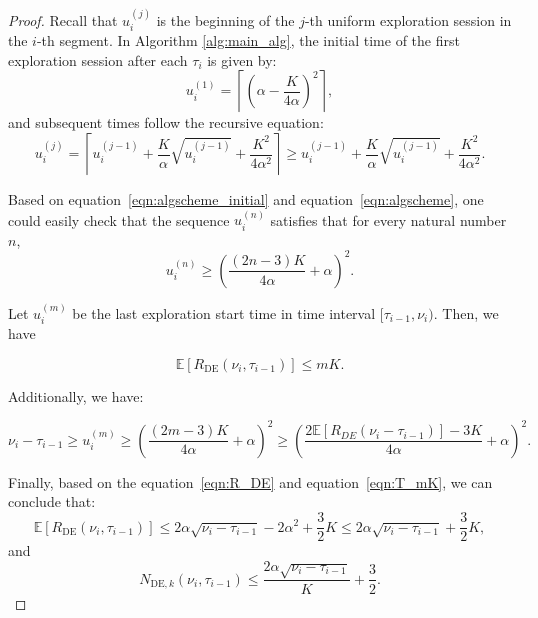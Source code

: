 \documentclass[twoside]{article}
\def\eqref#1{equation~\ref{#1}}
\newcommand{\E}{\mathbb{E}}
\theoremstyle{plain}
\theoremstyle{definition}
\theoremstyle{remark}
\begin{document}
\begin{proof}
    Recall that $u_{i}^{(j)}$ is the beginning of the $j$-th uniform exploration session in the $i$-th segment. In Algorithm \ref{alg:main_alg}, the initial time of the first exploration session after each $\tau_{i}$ is given by:
    \begin{equation}
        u_{i}^{(1)}=\left\lceil\left(\alpha-\frac{K}{4\alpha}\right)^{2}\right\rceil, \label{eqn:algscheme_initial}
    \end{equation}
    and subsequent times follow the recursive equation:
    \begin{equation}
        u_{i}^{(j)}=\left\lceil u_{i}^{(j-1)}+\frac{K}{\alpha}\sqrt{u_{i}^{(j-1)}}+\frac{K^{2}}{4\alpha^{2}}\right\rceil\geq u_{i}^{(j-1)}+\frac{K}{\alpha}\sqrt{u_{i}^{(j-1)}}+\frac{K^{2}}{4\alpha^{2}}. \label{eqn:algscheme}
    \end{equation}
   
    Based on \eqref{eqn:algscheme_initial} and \eqref{eqn:algscheme}, one could easily check that the sequence $u_{i}^{(n)}$ satisfies that for every natural number $n$,
    \begin{equation}\label{eqn:u_i_bound}
        u_{i}^{(n)} \geq \left(\frac{\left(2n-3\right)K}{4\alpha}+\alpha\right)^{2}.
    \end{equation}


    Let $u_{i}^{(m)}$ be the last exploration start time in time interval $[\tau_{i-1}, \nu_{i})$. Then, we have

    \begin{equation}
        \E\left[R_{\mathrm{DE}}\left(\nu_{i},\tau_{i-1}\right)\right]\leq mK. \label{eqn:R_DE}
    \end{equation}

    Additionally, we have:

    \begin{equation}
        \nu_{i}-\tau_{i-1}\geq u_{i}^{(m)} \geq \left(\frac{\left(2m-3\right)K}{4\alpha}+\alpha\right)^{2}\geq \left(\frac{2\E\left[R_{DE}\left(\nu_{i}-\tau_{i-1}\right)\right]-3K}{4\alpha}+\alpha\right)^{2}. \label{eqn:T_mK}
    \end{equation}


    Finally, based on the \eqref{eqn:R_DE} and \eqref{eqn:T_mK}, we can conclude that:              
    \begin{equation}
        \E\left[R_{\textrm{DE}}\left(\nu_{i},\tau_{i-1}\right)\right]\leq 2\alpha\sqrt{\nu_{i}-\tau_{i-1}}-2\alpha^2+\frac{3}{2}K
        \leq 2\alpha\sqrt{\nu_{i}-\tau_{i-1}}+\frac{3}{2}K,
    \end{equation}
    and
    \begin{equation}
        N_{\textrm{DE},k}\left(\nu_{i},\tau_{i-1}\right)\leq \frac{2\alpha\sqrt{\nu_{i}-\tau_{i-1}}}{K}+\frac{3}{2}.
    \end{equation}

\end{proof}
\end{document}

